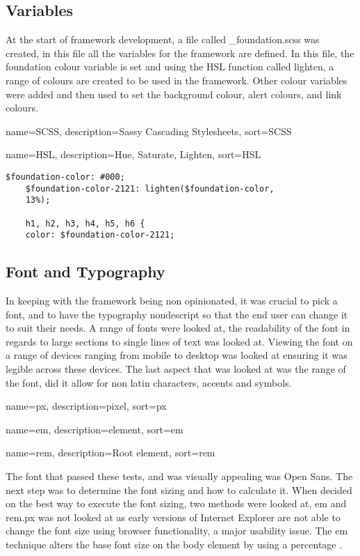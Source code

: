 \subsection*{Variables}
At the start of framework development, a file called \_foundation.scss was created, in this file all the variables for the framework are defined. In this file, the foundation colour variable is set and using the \gls{HSL} function called lighten, a range of colours are created to be used in the framework. Other colour variables were added and then used to set the background colour, alert colours, and link colours.

{
  name={SCSS},
  description={Sassy Cascading Stylesheets},
  sort=SCSS
}

{
  name={HSL},
  description={Hue, Saturate, Lighten},
  sort=HSL
}

\begin{lstlisting}[language=CSS3]
	$foundation-color: #000;
	$foundation-color-2121: lighten($foundation-color, 
	13%);

	h1, h2, h3, h4, h5, h6 {
  	color: $foundation-color-2121;
\end{lstlisting}

\subsection*{Font and Typography}
In keeping with the framework being non opinionated, it was crucial to pick a font, and to have the typography nondescript so that the end user can change it to suit their needs. A range of fonts were looked at, the readability of the font in regards to large sections to single lines of text was looked at. Viewing the font on a range of devices ranging from mobile to desktop was looked at ensuring it was legible across these devices. The last aspect that was looked at was the range of the font, did it allow for non latin characters, accents and symbols\cite{WORD16}.

{
  name={px},
  description={pixel},
  sort=px
}
%

{
  name={em},
  description={element},
  sort=em
}

{
  name={rem},
  description={Root element},
  sort=rem
}

\newpage
The font that passed these tests, and was visually appealing was Open Sans. The next step was to determine the font sizing and how to calculate it. When decided on the best way to execute the font sizing, two methods were looked at, \gls{em} and \gls{rem}.\gls{px} was not looked at as early versions of Internet Explorer are not able to change the font size using browser functionality, a major usability issue. The \gls{em} technique alters the base font size on the body element by using a percentage \cite{GUN16}.

